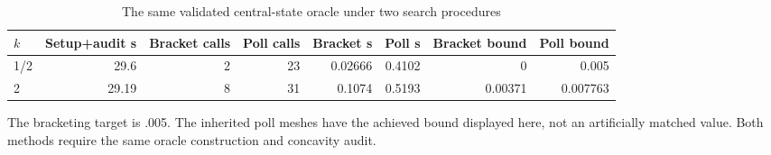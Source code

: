 \begin{table}[htbp]
\centering\footnotesize
\caption{The same validated central-state oracle under two search procedures}\label{tab:bracket30}
\begin{tabular}{lrrrrrrr}\toprule
$k$ & Setup+audit s & Bracket calls & Poll calls & Bracket s & Poll s & Bracket bound & Poll bound \\\midrule
1/2 & 29.6 & 2 & 23 & 0.02666 & 0.4102 & 0 & 0.005 \\
2 & 29.19 & 8 & 31 & 0.1074 & 0.5193 & 0.00371 & 0.007763 \\
\bottomrule\end{tabular}
\par\smallskip\begin{minipage}{.98\textwidth}\footnotesize The bracketing target is .005. The inherited poll meshes have the achieved bound displayed here, not an artificially matched value. Both methods require the same oracle construction and concavity audit.\end{minipage}
\end{table}
